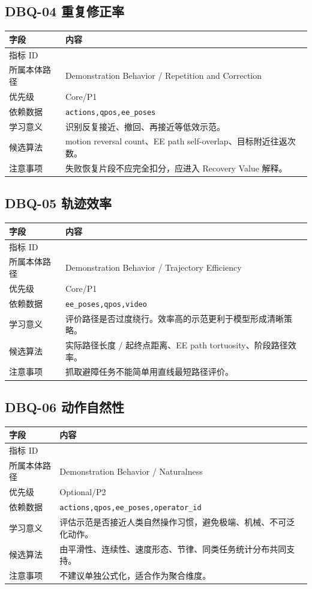\documentclass[UTF8,zihao=-4]{ctexart}
\newcommand{\Code}[1]{\texttt{#1}}
\newcommand{\MID}[1]{\texttt{\seqsplit{#1}}}
\begin{document}
\subsection{DBQ-04 重复修正率}

\begin{longtable}{L{3.6cm} L{9.6cm}}
\toprule
字段 & 内容 \\
\midrule
指标 ID & \MID{DBQ-04} \\
所属本体路径 & Demonstration Behavior / Repetition and Correction \\
优先级 & Core/P1 \\
依赖数据 & \Code{actions,qpos,ee\_poses} \\
学习意义 & 识别反复接近、撤回、再接近等低效示范。 \\
候选算法 & motion reversal count、EE path self-overlap、目标附近往返次数。 \\
注意事项 & 失败恢复片段不应完全扣分，应进入 Recovery Value 解释。 \\
\bottomrule
\end{longtable}

\subsection{DBQ-05 轨迹效率}

\begin{longtable}{L{3.6cm} L{9.6cm}}
\toprule
字段 & 内容 \\
\midrule
指标 ID & \MID{DBQ-05} \\
所属本体路径 & Demonstration Behavior / Trajectory Efficiency \\
优先级 & Core/P1 \\
依赖数据 & \Code{ee\_poses,qpos,video} \\
学习意义 & 评价路径是否过度绕行。效率高的示范更利于模型形成清晰策略。 \\
候选算法 & 实际路径长度 / 起终点距离、EE path tortuosity、阶段路径效率。 \\
注意事项 & 抓取避障任务不能简单用直线最短路径评价。 \\
\bottomrule
\end{longtable}

\subsection{DBQ-06 动作自然性}

\begin{longtable}{L{3.6cm} L{9.6cm}}
\toprule
字段 & 内容 \\
\midrule
指标 ID & \MID{DBQ-06} \\
所属本体路径 & Demonstration Behavior / Naturalness \\
优先级 & Optional/P2 \\
依赖数据 & \Code{actions,qpos,ee\_poses,operator\_id} \\
学习意义 & 评估示范是否接近人类自然操作习惯，避免极端、机械、不可泛化动作。 \\
候选算法 & 由平滑性、连续性、速度形态、节律、同类任务统计分布共同支持。 \\
注意事项 & 不建议单独公式化，适合作为聚合维度。 \\
\bottomrule
\end{longtable}
\end{document}
